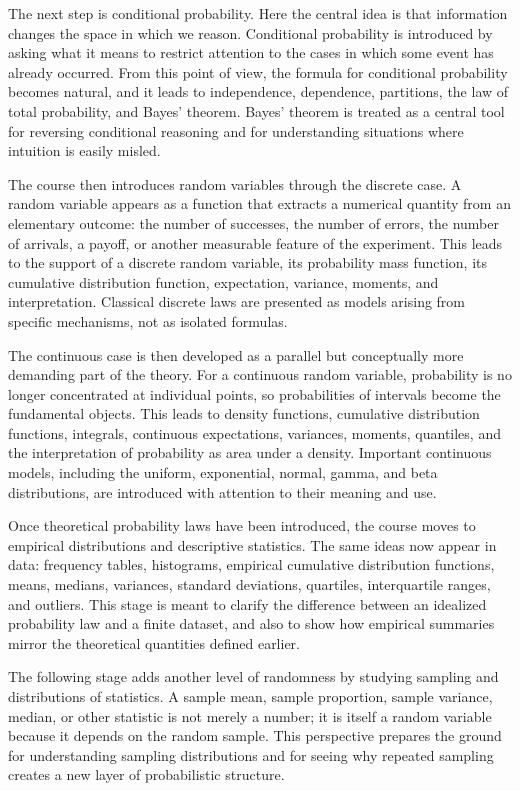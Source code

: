 The next step is conditional probability. Here the central idea is that information changes the space in which we reason. Conditional probability is introduced by asking what it means to restrict attention to the cases in which some event has already occurred. From this point of view, the formula for conditional probability becomes natural, and it leads to independence, dependence, partitions, the law of total probability, and Bayes' theorem. Bayes' theorem is treated as a central tool for reversing conditional reasoning and for understanding situations where intuition is easily misled.

The course then introduces random variables through the discrete case. A random variable appears as a function that extracts a numerical quantity from an elementary outcome: the number of successes, the number of errors, the number of arrivals, a payoff, or another measurable feature of the experiment. This leads to the support of a discrete random variable, its probability mass function, its cumulative distribution function, expectation, variance, moments, and interpretation. Classical discrete laws are presented as models arising from specific mechanisms, not as isolated formulas.

The continuous case is then developed as a parallel but conceptually more demanding part of the theory. For a continuous random variable, probability is no longer concentrated at individual points, so probabilities of intervals become the fundamental objects. This leads to density functions, cumulative distribution functions, integrals, continuous expectations, variances, moments, quantiles, and the interpretation of probability as area under a density. Important continuous models, including the uniform, exponential, normal, gamma, and beta distributions, are introduced with attention to their meaning and use.

Once theoretical probability laws have been introduced, the course moves to empirical distributions and descriptive statistics. The same ideas now appear in data: frequency tables, histograms, empirical cumulative distribution functions, means, medians, variances, standard deviations, quartiles, interquartile ranges, and outliers. This stage is meant to clarify the difference between an idealized probability law and a finite dataset, and also to show how empirical summaries mirror the theoretical quantities defined earlier.

The following stage adds another level of randomness by studying sampling and distributions of statistics. A sample mean, sample proportion, sample variance, median, or other statistic is not merely a number; it is itself a random variable because it depends on the random sample. This perspective prepares the ground for understanding sampling distributions and for seeing why repeated sampling creates a new layer of probabilistic structure.

